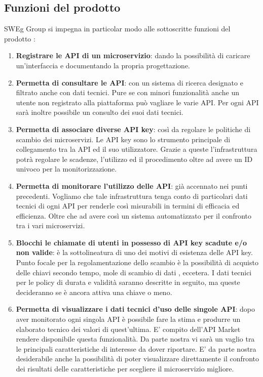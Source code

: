 \documentclass[12pt,a4paper,titlepage]{article}
\begin{document}
	\subsection{Funzioni del prodotto}
	SWEg Group si impegna in particolar modo alle sottoscritte funzioni del prodotto :
	\begin{enumerate}
		\item \textbf{Registrare le API di un microservizio}:	dando la possibilità di caricare un'interfaccia e documentando la propria progettazione.
		\item \textbf{Permetta di consultare le API}:	con un sistema di ricerca designato e filtrato anche con dati tecnici. Pure se con minori funzionalità anche un utente non registrato alla piattaforma può vagliare le varie API. Per ogni API sarà inoltre possibile un consulto dei suoi dati tecnici.
		\item \textbf{Permetta di associare diverse API key}: così da regolare le politiche di scambio dei microservizi. Le API key sono lo strumento principale di collegamento tra la API ed il suo utilizzatore. Grazie a queste l'infrastruttura potrà regolare le scadenze, l'utilizzo ed il procedimento oltre ad avere un ID univoco per la monitorizzazione. 
		\item \textbf{Permetta di monitorare l'utilizzo delle API}:	già accennato nei punti precedenti. Vogliamo che tale infrastruttura tenga conto di particolari dati tecnici di ogni API per renderle così misurabili in termini di efficacia ed efficienza. Oltre che ad avere così un sistema automatizzato per il confronto tra i vari microservizi.
		\item \textbf{Blocchi le chiamate di utenti in possesso di API key scadute e/o non valide}:	è la sottolineatura di uno dei motivi di esistenza delle API key. Punto focale per la regolamentazione dello scambio è la possibilità di acquisto delle chiavi secondo tempo, mole di scambio di dati , eccetera. I dati tecnici per le policy di durata e validità saranno descritte in seguito, ma queste decideranno se è ancora attiva una chiave o meno.
		\item \textbf{Permetta di visualizzare i dati tecnici d'uso delle singole API}:	dopo aver monitorato ogni singola API è possibile fare la stima e produrre un elaborato tecnico dei valori di quest'ultima. E' compito dell'API Market rendere disponibile questa funzionalità. Da parte nostra vi sarà un vaglio tra le principali caratteristiche di interesse da dover riportare. E' da parte nostra desiderabile anche la possibilità di poter visualizzare direttamente il confronto dei risultati delle caratteristiche per scegliere il microservizio migliore.

\end{enumerate}
\end{document}
